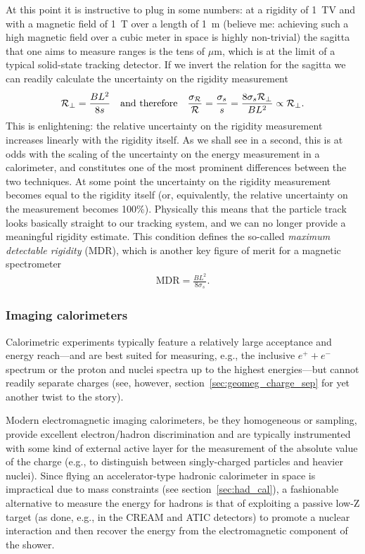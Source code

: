 At this point it is instructive to plug in some numbers: at a rigidity of 1~TV
and with a magnetic field of 1~T over a length of 1~m (believe me: achieving such
a high magnetic field over a cubic meter in space is highly non-trivial) the sagitta
that one aims to measure ranges is the tens of $\mu$m, which is at the limit of a
typical solid-state tracking detector. If we invert the relation for the sagitta
we can readily calculate the uncertainty on the rigidity measurement
\begin{align}
  \mathcal{R}_\perp = \frac{B L^2}{8 s} \quad\text{and therefore}\quad
  \frac{\sigma_{\mathcal{R}}}{\mathcal{R}} = \frac{\sigma_s}{s} =
  \frac{8 \sigma_s \mathcal{R}_\perp}{B L^2} \propto \mathcal{R}_\perp.
\end{align}
This is enlightening: the relative uncertainty on the rigidity measurement increases
linearly with the rigidity itself. As we shall see in a second, this is at odds
with the scaling of the uncertainty on the energy measurement in a calorimeter,
and constitutes one of the most prominent differences between the two techniques.
At some point the uncertainty on the rigidity measurement becomes equal to the
rigidity itself (or, equivalently, the relative uncertainty on the measurement
becomes 100\%). Physically this means that the particle track looks basically straight
to our tracking system, and we can no longer provide a meaningful rigidity estimate.
This condition defines the so-called \emph{maximum detectable rigidity} (MDR),
which is another key figure of merit for a magnetic spectrometer
\begin{align}
  \text{MDR} = \frac{B L^2}{8 \sigma_s}.
\end{align}


\subsubsection{Imaging calorimeters}

Calorimetric experiments typically feature a relatively large acceptance
and energy reach---and are best suited for measuring, e.g., the inclusive $e^+ + e^-$
spectrum or the proton and nuclei spectra up to the highest energies---but cannot
readily separate charges (see, however, section~\ref{sec:geomeg_charge_sep} for
yet another twist to the story).

Modern electromagnetic imaging calorimeters, be they homogeneous or sampling,
provide excellent electron/hadron discrimination and are typically instrumented
with some kind of external active layer for the measurement of the absolute
value of the charge (e.g., to distinguish between singly-charged particles and
heavier nuclei). Since flying an accelerator-type hadronic calorimeter in space
is impractical due to mass constraints (see section~\ref{sec:had_cal}),
a fashionable alternative to measure the energy for hadrons is that of
exploiting a passive low-Z target (as done, e.g., in the CREAM and ATIC
detectors) to promote a nuclear interaction and then recover the energy from
the electromagnetic component of the shower.

